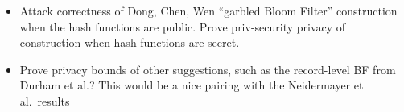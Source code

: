 {\begin{itemize}
\item Attack correctness of Dong, Chen, Wen ``garbled Bloom Filter'' construction when the hash functions are public.  Prove priv-security privacy of construction when hash functions are secret.  

\item Prove privacy bounds of other suggestions, such as the record-level BF from Durham et al.?  This would be a nice pairing with the Neidermayer et al.\ results 

\end{itemize}
}

